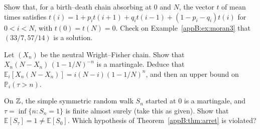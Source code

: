 \begin{exercise}
Show that, for a birth--death chain absorbing at $0$ and $N$, the vector $t$ of mean times satisfies
$t(i)=1+p_it(i+1)+q_it(i-1)+(1-p_i-q_i)t(i)$ for $0<i<N$, with $t(0)=t(N)=0$. Check on Example~\ref{appB:ex:moran3}
that $(33/7,57/14)$ is a solution.
\end{exercise}

\begin{exercise}
Let $(X_n)$ be the neutral Wright--Fisher chain. Show that $X_n(N-X_n)\,(1-1/N)^{-n}$ is a martingale. Deduce
that $\mathbb E_i[X_n(N-X_n)]=i(N-i)(1-1/N)^n$, and then an upper bound on $\mathbb P_i(\tau>n)$.
\end{exercise}

\begin{exercise}
On $\mathbb{Z}$, the simple symmetric random walk $S_n$ started at $0$ is a martingale, and $\tau=\inf\{n:S_n=1\}$ is finite
almost surely (take this as given). Show that $\mathbb E[S_\tau]=1\ne\mathbb E[S_0]$. Which hypothesis of
Theorem~\ref{appB:thm:arret} is violated?
\end{exercise}
